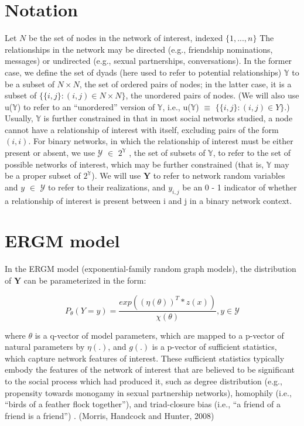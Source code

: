 \documentclass[12pt]{ociamthesis}  %
\begin{document}
	\section{Notation}
	Let $N$ be the set of nodes in the network of interest, indexed $\{ 1,...,n\}$ The relationships in
	the network may be directed (e.g., friendship nominations, messages) or undirected (e.g., sexual
	partnerships, conversations). In the former case, we define the set of dyads (here used to refer
	to potential relationships) $\mathbb{Y}$ to be a subset of $N \times N$, the set of ordered pairs of nodes; in the
	latter case, it is a subset of $\{ \{i, j\} : (i, j) \in N \times N\}$, the unordered pairs of nodes. (We will also
	use u($\mathbb{Y}$) to refer to an “unordered” version of $\mathbb{Y}$, i.e., u($\mathbb{Y}$) $\equiv$ $\{\{i, j\} : (i, j) \in Y \}$.) Usually, $\mathbb{Y}$ is
	further constrained in that in most social networks studied, a node cannot have a relationship of
	interest with itself, excluding pairs of the form $(i, i)$.
	For binary networks, in which the relationship of interest must be either present or absent,
	we use $\mathcal{Y}$ $\in$ $2^{\mathbb{Y}}$
	, the set of subsets of $\mathbb{Y}$, to refer to the set of possible networks of interest, which may be further constrained (that is, $\mathbb{Y}$ may be a proper subset of $2^{\mathbb{Y}}$). We will use $\textbf{Y}$ to refer to
	network random variables and $y$ $\in$ $\mathcal{Y}$ to refer to their realizations, and $y_{i,j}$ be an 0 - 1 indicator of
	whether a relationship of interest is present between i and j in a binary network context.
	
	
	\section{ERGM model}
	In the ERGM model (exponential-family random graph models), the distribution of $\textbf{Y}$ can be parameterized in the form:
	
	\begin{equation}
	P_{\theta}(Y = y) = \frac{exp((\eta(\theta)) ^{T}*z(x))}{\chi(\theta)}, y \in \mathcal{Y}
	\end{equation}
	
	where $\theta$ is a q-vector of model parameters, which are mapped to a p-vector of natural parameters
	by $\eta(.)$, and $g(.)$ is a p-vector of sufficient statistics, which capture network features of interest. These sufficient statistics typically embody the
	features of the network of interest that are believed to be significant to the social
	process which had produced it, such as degree distribution (e.g., propensity
	towards monogamy in sexual partnership networks), homophily (i.e., “birds of
	a feather flock together”), and triad-closure bias (i.e., “a friend of a friend is a
	friend”) . (Morris, Handcock and Hunter, 2008)
	
\end{document}
